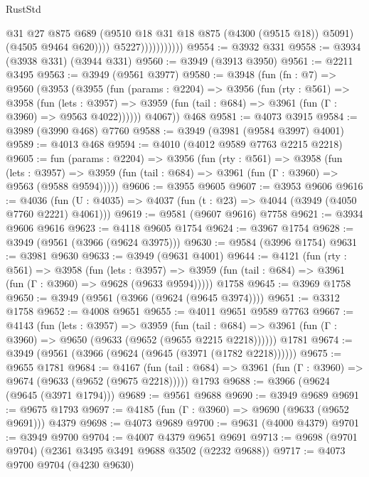 \begin{lexlean}{RustStd}
\begin{coremodule}
                                @31
                                @27
                                @875
                                @689
                                (@9510 @18 @31 @18 @875 (@4300 (@9515 @18)) @5091)
                                (@4505 @9464 @620))))
                          @5227)))))))))))
@9554 := @3932 @331
@9558 := @3934 (@3938 @331) (@3944 @331)
@9560 := @3949 (@3913 @3950)
@9561 := @2211 @3495
@9563 := @3949 (@9561 @3977)
@9580 := @3948
    (fun (fn : @7) =>
    @9560
      (@3953
        (@3955
          (fun (params : @2204) =>
          @3956
            (fun (rty : @561) =>
            @3958
              (fun (lets : @3957) =>
              @3959 (fun (tail : @684) => @3961 (fun (Γ : @3960) => @9563 @4022))))))
        @4067))
    @468
@9581 := @4073 @3915
@9584 := @3989 (@3990 @468) @7760
@9588 := @3949 (@3981 (@9584 @3997) @4001)
@9589 := @4013 @468
@9594 := @4010 (@4012 @9589 @7763 @2215 @2218)
@9605 := fun (params : @2204) =>
  @3956
    (fun (rty : @561) =>
    @3958
      (fun (lets : @3957) =>
      @3959 (fun (tail : @684) => @3961 (fun (Γ : @3960) => @9563 (@9588 @9594)))))
@9606 := @3955 @9605
@9607 := @3953 @9606
@9616 := @4036 (fun (U : @4035) => @4037 (fun (t : @23) => @4044 (@3949 (@4050 @7760 @2221) @4061)))
@9619 := @9581 (@9607 @9616) @7758
@9621 := @3934 @9606 @9616
@9623 := @4118 @9605 @1754
@9624 := @3967 @1754
@9628 := @3949 (@9561 (@3966 (@9624 @3975)))
@9630 := @9584 (@3996 @1754)
@9631 := @3981 @9630
@9633 := @3949 (@9631 @4001)
@9644 := @4121
    (fun (rty : @561) =>
    @3958
      (fun (lets : @3957) =>
      @3959 (fun (tail : @684) => @3961 (fun (Γ : @3960) => @9628 (@9633 @9594)))))
    @1758
@9645 := @3969 @1758
@9650 := @3949 (@9561 (@3966 (@9624 (@9645 @3974))))
@9651 := @3312 @1758
@9652 := @4008 @9651
@9655 := @4011 @9651 @9589 @7763
@9667 := @4143
    (fun (lets : @3957) =>
    @3959
      (fun (tail : @684) => @3961 (fun (Γ : @3960) => @9650 (@9633 (@9652 (@9655 @2215 @2218))))))
    @1781
@9674 := @3949 (@9561 (@3966 (@9624 (@9645 (@3971 (@1782 @2218))))))
@9675 := @9655 @1781
@9684 := @4167
    (fun (tail : @684) => @3961 (fun (Γ : @3960) => @9674 (@9633 (@9652 (@9675 @2218)))))
    @1793
@9688 := @3966 (@9624 (@9645 (@3971 @1794)))
@9689 := @9561 @9688
@9690 := @3949 @9689
@9691 := @9675 @1793
@9697 := @4185 (fun (Γ : @3960) => @9690 (@9633 (@9652 @9691))) @4379
@9698 := @4073 @9689
@9700 := @9631 (@4000 @4379)
@9701 := @3949 @9700
@9704 := @4007 @4379 @9651 @9691
@9713 := @9698 (@9701 @9704) (@2361 @3495 @3491 @9688 @3502 (@2232 @9688))
@9717 := @4073 @9700 @9704 (@4230 @9630)

\end{coremodule}
\end{lexlean}

